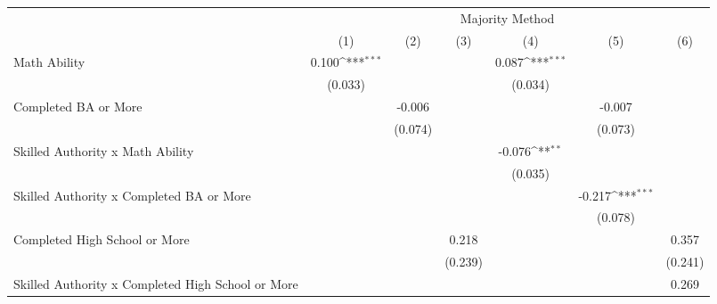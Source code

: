 \documentclass[]{article}
\begin{document}
\begin{table}
\begin{adjustbox}{width=\columnwidth,center}

{
\def\sym#1{\ifmmode^{#1}\else\(^{#1}\)\fi}
\begin{tabular}{l*{6}{c}}
\hline\hline
                &\multicolumn{6}{c}{Majority Method}                                                                              \\\cmidrule(lr){2-7}
                &\multicolumn{1}{c}{(1)}         &\multicolumn{1}{c}{(2)}         &\multicolumn{1}{c}{(3)}         &\multicolumn{1}{c}{(4)}         &\multicolumn{1}{c}{(5)}         &\multicolumn{1}{c}{(6)}         \\
\hline
Math Ability    &    0.100\sym{***}&                  &                  &    0.087\sym{***}&                  &                  \\
                &  (0.033)         &                  &                  &  (0.034)         &                  &                  \\
[1em]
Completed BA or More&                  &   -0.006         &                  &                  &   -0.007         &                  \\
                &                  &  (0.074)         &                  &                  &  (0.073)         &                  \\
[1em]
Skilled Authority x Math Ability&                  &                  &                  &   -0.076\sym{**} &                  &                  \\
                &                  &                  &                  &  (0.035)         &                  &                  \\
[1em]
Skilled Authority x Completed BA or More&                  &                  &                  &                  &   -0.217\sym{***}&                  \\
                &                  &                  &                  &                  &  (0.078)         &                  \\
[1em]
Completed High School or More&                  &                  &    0.218         &                  &                  &    0.357         \\
                &                  &                  &  (0.239)         &                  &                  &  (0.241)         \\
[1em]
Skilled Authority x Completed High School or More&                  &                  &                  &                  &                  &    0.269         \\

\end{tabular}}
\end{adjustbox}
\end{table}
\end{document}
